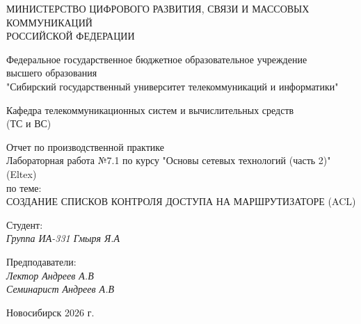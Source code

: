 \thispagestyle{empty}

\begin{center}
    МИНИСТЕРСТВО ЦИФРОВОГО РАЗВИТИЯ, СВЯЗИ И МАССОВЫХ КОММУНИКАЦИЙ \\ РОССИЙСКОЙ ФЕДЕРАЦИИ

    \vspace{20pt}

    Федеральное государственное бюджетное образовательное учреждение  \\  высшего образования \\
    "Сибирский государственный университет телекоммуникаций и информатики" \\

    \vspace{20pt}

    Кафедра телекоммуникационных систем и вычислительных средств \\  (ТС и ВС)
\end{center}

\vfill

\begin{center}
    Отчет по производственной практике \\  
    Лабораторная работа №7.1 по курсу "Основы сетевых технологий (часть 2)" (Eltex) \\
    \vspace{20pt}
    по теме: \\
    \uppercase{Создание списков контроля доступа на маршрутизаторе (ACL)}
\end{center}

\vfill

    \noindent Студент: \\
    \textit{Группа ИА-331 \hfill Гмыря Я.А} 

    \vspace{20pt}
 
    \noindent Предподаватели: \\
    \textit{Лектор \hfill Андреев А.В} \\
    \textit{Семинарист \hfill Андреев А.В}

\vfill

\begin{center}
    Новосибирск 2026 г.
\end{center}